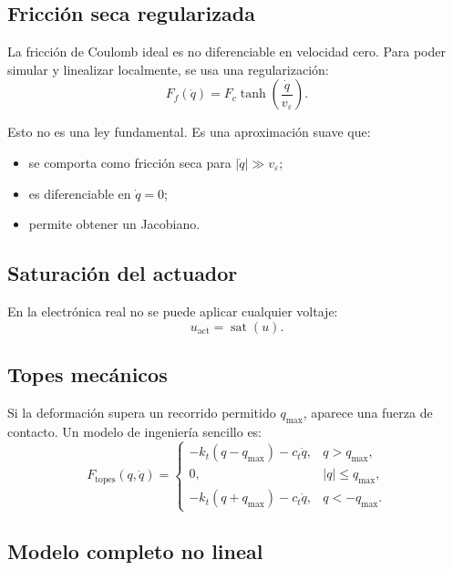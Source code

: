 \documentclass[11pt]{article}
\begin{document}
\subsection{Fricci\'on seca regularizada}

La fricci\'on de Coulomb ideal es no diferenciable en velocidad cero. Para poder simular y linealizar localmente, se usa una regularizaci\'on:
\begin{equation}
F_f(\dot q) = F_c \tanh\left(\frac{\dot q}{v_\varepsilon}\right).
\label{eq:fric}
\end{equation}

Esto no es una ley fundamental. Es una aproximaci\'on suave que:

\begin{itemize}[leftmargin=1.2cm]
\item se comporta como fricci\'on seca para $|\dot q| \gg v_\varepsilon$;
\item es diferenciable en $\dot q=0$;
\item permite obtener un Jacobiano.
\end{itemize}

\subsection{Saturaci\'on del actuador}

En la electr\'onica real no se puede aplicar cualquier voltaje:
\begin{equation}
u_{\text{act}} = \operatorname{sat}(u).
\label{eq:sat}
\end{equation}

\subsection{Topes mec\'anicos}

Si la deformaci\'on supera un recorrido permitido $q_{\max}$, aparece una fuerza de contacto. Un modelo de ingenier\'ia sencillo es:
\begin{equation}
F_{\text{topes}}(q,\dot q)=
\begin{cases}
-k_t(q-q_{\max})-c_t\dot q, & q>q_{\max},\\[4pt]
0, & |q|\le q_{\max},\\[4pt]
-k_t(q+q_{\max})-c_t\dot q, & q<-q_{\max}.
\end{cases}
\label{eq:stops}
\end{equation}

\subsection{Modelo completo no lineal}
\end{document}
